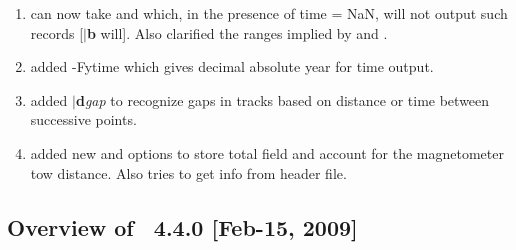 \begin{enumerate}
	\item {} can now take  and  which, in the presence of time = NaN,
		will not output such records [$|${\bf b} will].  Also clarified the ranges implied by  and .
	\item {} added -Fytime which gives decimal absolute year for time output.
	\item {} added $|${\bf d}{\it gap} to recognize gaps in tracks based on
			distance or time between successive points.
	\item {} added new  and  options to store total field and account for the
		magnetometer tow distance. Also tries to get info from header file.
\end{enumerate}


\subsection{Overview of \gmt\ 4.4.0 [Feb-15, 2009]}

